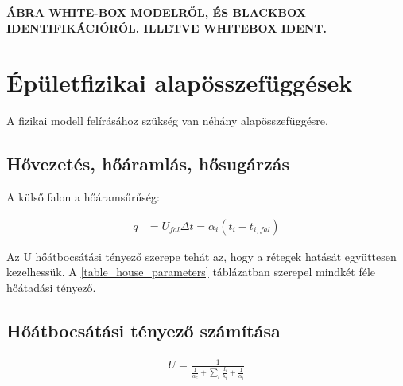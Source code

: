  \textbf{ÁBRA WHITE-BOX MODELRŐL, ÉS BLACKBOX IDENTIFIKÁCIÓRÓL. ILLETVE WHITEBOX IDENT.}


\section{Épületfizikai alapösszefüggések}
 
 A fizikai modell felírásához szükség van néhány alapösszefüggésre.
 
 \vspace{18pt}
 
\subsection*{Hővezetés, hőáramlás, hősugárzás}

A külső falon a hőáramsűrűség:

\begin{equation}\label{eq_hoveszteseg}
\begin{aligned}
q &= U_{fal}\Delta t = \alpha_i\left(t_i-t_{i,fal}\right)
\end{aligned}
\end{equation}

Az U hőátbocsátási tényező szerepe tehát az, hogy a rétegek hatását együttesen kezelhessük. A \ref{table_house_parameters} táblázatban szerepel mindkét féle hőátadási tényező. 



\begin{table}[t]
	\footnotesize
	\centering
	\caption{Hőközlés fajtái}
	
	\label{tab:HeatExchangeTypes}
\end{table}
 


 
 
 
 
 

\subsection*{Hőátbocsátási tényező számítása}


\begin{equation}\label{eq_hoatbcsatas_U}
\begin{aligned}
U = \frac{1}{\frac{1}{\alpha_e}+\sum\limits_{i}^{}\frac{d_i}{\lambda_i}+\frac{1}{\alpha_i}}
\end{aligned}
\end{equation}



